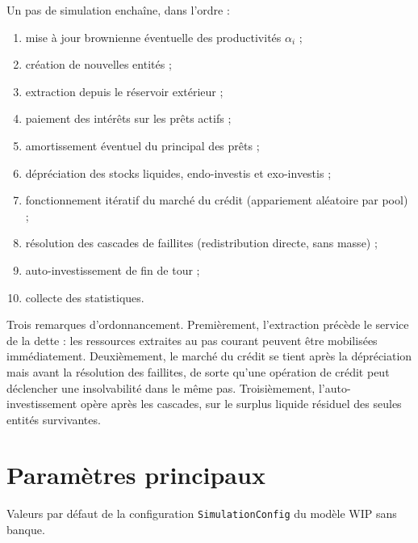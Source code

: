 \documentclass[11pt,a4paper]{article}
\begin{document}
Un pas de simulation enchaîne, dans l'ordre :

\begin{enumerate}
    \item mise à jour brownienne éventuelle des productivités \(\alpha_i\) ;
    \item création de nouvelles entités ;
    \item extraction depuis le réservoir extérieur ;
    \item paiement des intérêts sur les prêts actifs ;
    \item amortissement éventuel du principal des prêts ;
    \item dépréciation des stocks liquides, endo-investis et exo-investis ;
    \item fonctionnement itératif du marché du crédit (appariement aléatoire par pool) ;
    \item résolution des cascades de faillites (redistribution directe, sans masse) ;
    \item auto-investissement de fin de tour ;
    \item collecte des statistiques.
\end{enumerate}

Trois remarques d'ordonnancement. Premièrement, l'extraction précède le service de la dette : les ressources extraites au pas courant peuvent être mobilisées immédiatement. Deuxièmement, le marché du crédit se tient après la dépréciation mais avant la résolution des faillites, de sorte qu'une opération de crédit peut déclencher une insolvabilité dans le même pas. Troisièmement, l'auto-investissement opère après les cascades, sur le surplus liquide résiduel des seules entités survivantes.

\section{Paramètres principaux}

Valeurs par défaut de la configuration \texttt{SimulationConfig} du modèle WIP sans banque.
\end{document}
